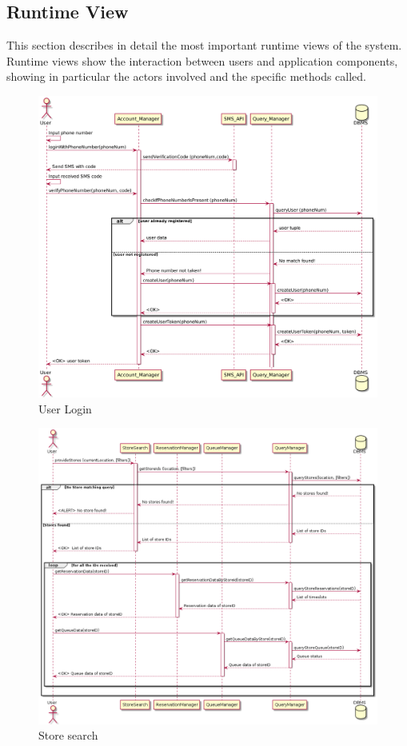 \newpage

\subsection{Runtime View}
This section describes in detail the most important runtime views of the system. Runtime views show the interaction between users and application components, showing in particular the actors involved and the specific methods called.

\begin{figure}[H]
    \includegraphics[width=\linewidth]{uml/seq_user_login.png}
    \caption{User Login}
    \label{fig:seq_user_login}
\end{figure}

\begin{figure}[H]
    \includegraphics[width=\linewidth]{uml/seq_search_store.png}
    \caption{Store search}
    \label{fig:seq_store_search}
\end{figure}

